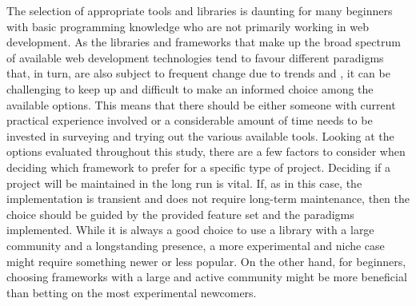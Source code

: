 The selection of appropriate tools and libraries is daunting for many beginners with basic programming knowledge who are not primarily working in web development.
As the libraries and frameworks that make up the broad spectrum of available web development technologies tend to favour different paradigms that, in turn, are also subject to frequent change due to trends and , it can be challenging to keep up and difficult to make an informed choice among the available options.
This means that there should be either someone with current practical experience involved or a considerable amount of time needs to be invested in surveying and trying out the various available tools.
Looking at the options evaluated throughout this study, there are a few factors to consider when deciding which framework to prefer for a specific type of project.
Deciding if a project will be maintained in the long run is vital.
If, as in this case, the implementation is transient and does not require long-term maintenance, then the choice should be guided by the provided feature set and the paradigms implemented.
While it is always a good choice to use a library with a large community and a longstanding presence, a more experimental and niche case might require something newer or less popular.
On the other hand, for beginners, choosing frameworks with a large and active community might be more beneficial than betting on the most experimental newcomers.


